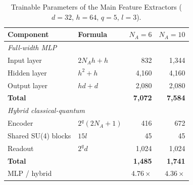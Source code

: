 \begin{table}[t]
\centering
\caption{Trainable Parameters of the Main Feature Extractors ($d=32$, $h=64$, $q=5$, $l=3$).}
\label{tab:param_count}
\footnotesize
\begin{tabular}{llrr}
\toprule
Component & Formula & $N_A=6$ & $N_A=10$ \\
\midrule
\multicolumn{4}{l}{\textit{Full-width MLP}} \\
Input layer & $2N_Ah+h$ & 832 & 1{,}344 \\
Hidden layer & $h^2+h$ & 4{,}160 & 4{,}160 \\
Output layer & $hd+d$ & 2{,}080 & 2{,}080 \\
\textbf{Total} & & \textbf{7{,}072} & \textbf{7{,}584} \\
\midrule
\multicolumn{4}{l}{\textit{Hybrid classical-quantum}} \\
Encoder & $2^q(2N_A+1)$ & 416 & 672 \\
Shared SU(4) blocks & $15l$ & 45 & 45 \\
Readout & $2^qd$ & 1{,}024 & 1{,}024 \\
\textbf{Total} & & \textbf{1{,}485} & \textbf{1{,}741} \\
\midrule
MLP / hybrid & & $4.76\times$ & $4.36\times$ \\
\bottomrule
\end{tabular}
\end{table}
